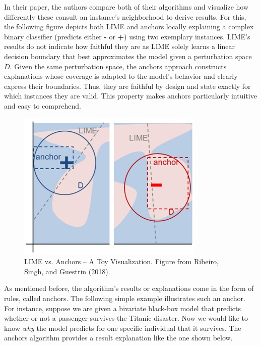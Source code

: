 \documentclass[12pt,]{krantz}
\begin{document}
In their paper, the authors compare both of their algorithms and
visualize how differently these consult an instance's neighborhood to
derive results. For this, the following figure depicts both LIME and
anchors locally explaining a complex binary classifier (predicts either
\textbf{-} or \textbf{+}) using two exemplary instances. LIME's results
do not indicate how faithful they are as LIME solely learns a linear
decision boundary that best approximates the model given a perturbation
space \(D\). Given the same perturbation space, the anchors approach
constructs explanations whose coverage is adapted to the model's
behavior and clearly express their boundaries. Thus, they are faithful
by design and state exactly for which instances they are valid. This
property makes anchors particularly intuitive and easy to comprehend.

\begin{figure}

{\centering \includegraphics[width=\textwidth]{images/anchors-visualization} 

}

\caption{LIME vs. Anchors -- A Toy Visualization. Figure from Ribeiro, Singh, and Guestrin (2018).}\label{fig:unnamed-chunk-29}
\end{figure}

As mentioned before, the algorithm's results or explanations come in the
form of rules, called anchors. The following simple example illustrates
such an anchor. For instance, suppose we are given a bivariate black-box
model that predicts whether or not a passenger survives the Titanic
disaster. Now we would like to know \emph{why} the model predicts for
one specific individual that it survives. The anchors algorithm provides
a result explanation like the one shown below.
\end{document}
